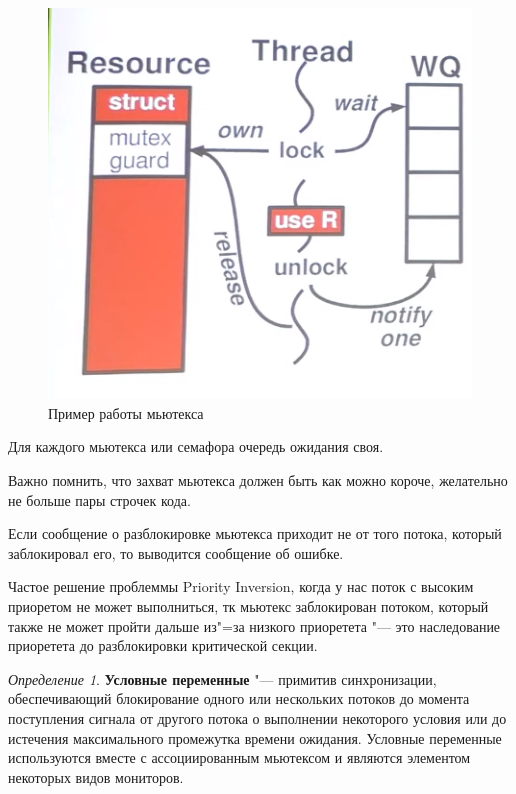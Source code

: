 \documentclass[bachelor, och, book]{SCWorks}
\theoremstyle{remark}
\newtheorem{definition}{Определение}
\begin{document}
    \begin{figure}[H]
        \begin{center}
            \includegraphics[scale=0.40]{res/example-Mutex.png}
            \caption{Пример работы мьютекса}
        \end{center}
    \end{figure}


    Для каждого мьютекса или семафора очередь ожидания своя.

    Важно помнить, что захват мьютекса должен быть как можно короче, желательно не больше пары строчек кода.

    Если сообщение о разблокировке мьютекса приходит не от того потока, который заблокировал его, то выводится сообщение об ошибке.

    Частое решение проблеммы Priority Inversion, когда у нас поток с высоким приоретом не может выполниться, тк мьютекс заблокирован потоком, который также не может пройти дальше из"=за низкого приоретета "--- это наследование приоретета до разблокировки критической секции.

    \begin{definition}
        \textbf{Условные переменные} "--- примитив синхронизации, обеспечивающий блокирование одного или нескольких потоков до момента поступления сигнала от другого потока о выполнении некоторого условия или до истечения максимального промежутка времени ожидания. Условные переменные используются вместе с ассоциированным мьютексом и являются элементом некоторых видов мониторов.
    \end{definition}
\end{document}

